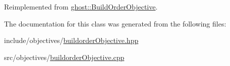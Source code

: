 Reimplemented from \hyperlink{classghost_1_1BuildOrderObjective_a07306469a8512e33a420d7f8ebab507b}{ghost\-::\-Build\-Order\-Objective}.



The documentation for this class was generated from the following files\-:\begin{DoxyCompactItemize}
\item 
include/objectives/\hyperlink{buildorderObjective_8hpp}{buildorder\-Objective.\-hpp}\item 
src/objectives/\hyperlink{buildorderObjective_8cpp}{buildorder\-Objective.\-cpp}\end{DoxyCompactItemize}
